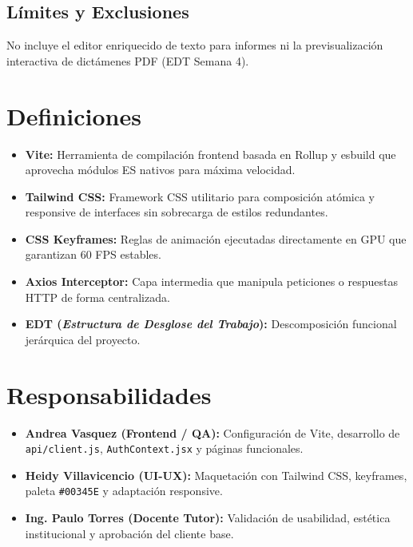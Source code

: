 \documentclass[12pt,a4paper]{article}
\begin{document}
\subsection{Límites y Exclusiones}
No incluye el editor enriquecido de texto para informes ni la previsualización interactiva de dictámenes PDF (EDT Semana 4).

\section{Definiciones}
\begin{itemize}[leftmargin=1.5em, itemsep=2pt, topsep=2pt]
    \item \textbf{Vite:} Herramienta de compilación frontend basada en Rollup y esbuild que aprovecha módulos ES nativos para máxima velocidad.
    \item \textbf{Tailwind CSS:} Framework CSS utilitario para composición atómica y responsive de interfaces sin sobrecarga de estilos redundantes.
    \item \textbf{CSS Keyframes:} Reglas de animación ejecutadas directamente en GPU que garantizan 60 FPS estables.
    \item \textbf{Axios Interceptor:} Capa intermedia que manipula peticiones o respuestas HTTP de forma centralizada.
    \item \textbf{EDT (\textit{Estructura de Desglose del Trabajo}):} Descomposición funcional jerárquica del proyecto.
\end{itemize}

\section{Responsabilidades}
\begin{itemize}[leftmargin=1.5em, itemsep=2pt, topsep=2pt]
    \item \textbf{Andrea Vasquez (Frontend / QA):} Configuración de Vite, desarrollo de \texttt{api/client.js}, \texttt{AuthContext.jsx} y páginas funcionales.
    \item \textbf{Heidy Villavicencio (UI-UX):} Maquetación con Tailwind CSS, keyframes, paleta \texttt{\#00345E} y adaptación responsive.
    \item \textbf{Ing. Paulo Torres (Docente Tutor):} Validación de usabilidad, estética institucional y aprobación del cliente base.
\end{itemize}
\end{document}
